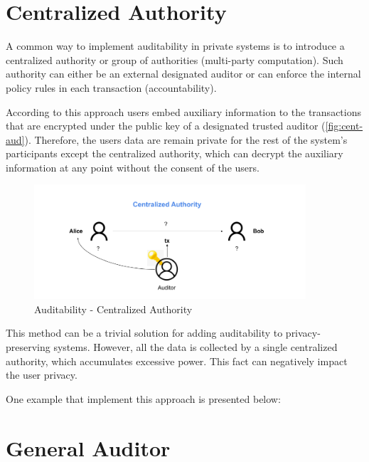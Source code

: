 \section{Centralized Authority}

A common way to implement auditability in private systems is to introduce a centralized authority or group of authorities (multi-party computation). Such authority can either be an external designated auditor or can enforce the internal policy rules in each transaction (accountability). 

According to this approach users embed auxiliary information to the transactions that are encrypted under the public key of a designated trusted auditor (\autoref{fig:cent-aud}). Therefore, the users data are remain private for the rest of the system's participants except the centralized authority, which can decrypt the auxiliary information at any point without the consent of the users. 

\begin{figure}
    \centering
    \includegraphics[width=0.9\textwidth]{images/privacy/Auditability in blockchain - Centralized.png}
    \caption{Auditability - Centralized Authority}
    \label{fig:cent-aud}
\end{figure}


This method can be a trivial solution for adding auditability to privacy-preserving systems. However, all the data is collected by a single centralized authority, which accumulates excessive power. This fact can negatively impact the user privacy.

One example that implement this approach is presented below:


% 
% 


\section{General Auditor}

